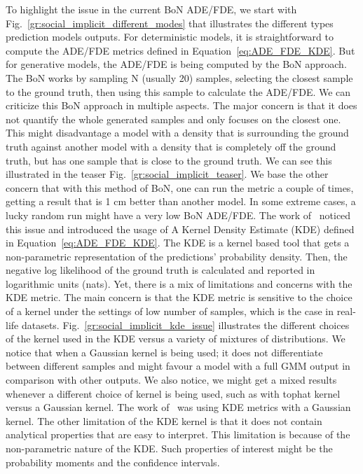 \documentclass[runningheads]{llncs}
\begin{document}
To highlight the issue in the current BoN ADE/FDE, we start with Fig.~\ref{gr:social_implicit_different_modes} that illustrates the different types prediction models outputs. For deterministic models, it is straightforward to compute the ADE/FDE metrics defined in Equation~\ref{eq:ADE_FDE_KDE}. But for generative models, the ADE/FDE is being computed by the BoN approach. The BoN works by sampling N (usually 20) samples, selecting the closest sample to the ground truth, then using this sample to calculate the ADE/FDE. We can criticize this BoN approach in multiple aspects. The major concern is that it does not quantify the whole generated samples and only focuses on the closest one. This might disadvantage a model with a density that is surrounding the ground truth against another model with a density that is completely off the ground truth, but has one sample that is close to the ground truth. We can see this illustrated in the teaser Fig.~\ref{gr:social_implicit_teaser}. We base the other concern that with this method of BoN, one can run the metric a couple of times, getting a result that is 1 cm better than another model. In some extreme cases, a lucky random run might have a very low BoN ADE/FDE. The work of~\cite{ivanovic2019trajectron} noticed this issue and introduced the usage of A Kernel Density Estimate (KDE) defined in Equation~\ref{eq:ADE_FDE_KDE}. The KDE is a kernel based tool that gets a non-parametric representation of the predictions’ probability density. Then, the negative log likelihood of the ground truth is calculated and reported in logarithmic units (nats). Yet, there is a mix of limitations and concerns with the KDE metric. 
The main concern is that the KDE metric is sensitive to the choice of a kernel under the settings of low number of samples, which is the case in real-life datasets. Fig.~\ref{gr:social_implicit_kde_issue} illustrates the different choices of the kernel used in the KDE versus a variety of mixtures of distributions. We notice that when a Gaussian kernel is being used; it does not differentiate between different samples and might favour a model with a full GMM output in comparison with other outputs. We also notice, we might get a mixed results whenever a different choice of kernel is being used, such as with tophat kernel versus a Gaussian kernel. The work of~\cite{ivanovic2019trajectron} was using KDE metrics with a Gaussian kernel. The other limitation of the KDE kernel is that it does not contain analytical properties that are easy to interpret. This limitation is because of the non-parametric nature of the KDE. Such properties of interest might be the probability moments and the confidence intervals.
\end{document}
